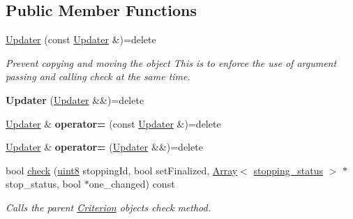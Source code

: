 \subsection*{Public Member Functions}
\begin{DoxyCompactItemize}
\item 
\mbox{\label{classgko_1_1stop_1_1Criterion_1_1Updater_aa8356e2fbfaf46cab62d8f8a905ab8bd}} 
\hyperlink{classgko_1_1stop_1_1Criterion_1_1Updater_aa8356e2fbfaf46cab62d8f8a905ab8bd}{Updater} (const \hyperlink{classgko_1_1stop_1_1Criterion_1_1Updater}{Updater} \&)=delete
\begin{DoxyCompactList}\small\item\em Prevent copying and moving the object This is to enforce the use of argument passing and calling check at the same time. \end{DoxyCompactList}\item 
\mbox{\label{classgko_1_1stop_1_1Criterion_1_1Updater_acaf5e487db911d5d4375c2e802888cd5}} 
{\bfseries Updater} (\hyperlink{classgko_1_1stop_1_1Criterion_1_1Updater}{Updater} \&\&)=delete
\item 
\mbox{\label{classgko_1_1stop_1_1Criterion_1_1Updater_a2e021de1ea9b876fd07c25653dab711c}} 
\hyperlink{classgko_1_1stop_1_1Criterion_1_1Updater}{Updater} \& {\bfseries operator=} (const \hyperlink{classgko_1_1stop_1_1Criterion_1_1Updater}{Updater} \&)=delete
\item 
\mbox{\label{classgko_1_1stop_1_1Criterion_1_1Updater_a227379f9ce089bfa0edb71655464e0c5}} 
\hyperlink{classgko_1_1stop_1_1Criterion_1_1Updater}{Updater} \& {\bfseries operator=} (\hyperlink{classgko_1_1stop_1_1Criterion_1_1Updater}{Updater} \&\&)=delete
\item 
bool \hyperlink{classgko_1_1stop_1_1Criterion_1_1Updater_a45c08cadb75dbab3af4f52ce0684714d}{check} (\hyperlink{namespacegko_a3950fc3732811a8563484e5098c31531}{uint8} stopping\+Id, bool set\+Finalized, \hyperlink{classgko_1_1Array}{Array}$<$ \hyperlink{classgko_1_1stopping__status}{stopping\+\_\+status} $>$ $\ast$stop\+\_\+status, bool $\ast$one\+\_\+changed) const
\begin{DoxyCompactList}\small\item\em Calls the parent \hyperlink{classgko_1_1stop_1_1Criterion}{Criterion} object\textquotesingle{}s check method. \end{DoxyCompactList}\item 

\end{DoxyCompactItemize}
